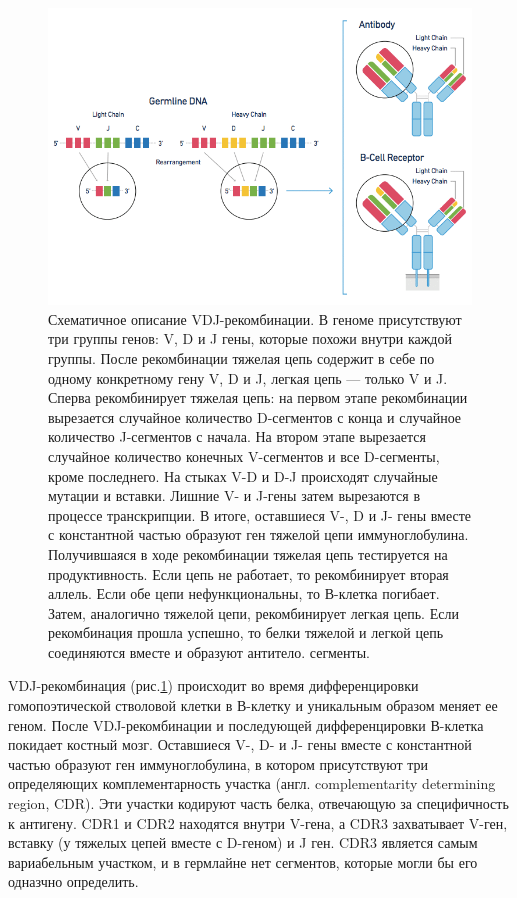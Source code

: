 \documentclass{spbau-diploma}
\begin{document}
\begin{figure}[h!]
    \centering
    \includegraphics[width=.9\textwidth]{figures/10x_vdj_recombination.png}
    \caption{Схематичное описание VDJ-рекомбинации.
    В геноме присутствуют три группы генов: V, D и J гены, которые похожи внутри каждой группы.
    После рекомбинации тяжелая цепь содержит в себе по одному конкретному гену V, D и J, легкая цепь --- только V и J.
    Сперва рекомбинирует тяжелая цепь: на первом этапе рекомбинации вырезается случайное количество D-сегментов с конца и случайное количество J-сегментов с начала.
    На втором этапе вырезается случайное количество конечных V-сегментов и все D-сегменты, кроме последнего.
    На стыках V-D и D-J происходят случайные мутации и вставки.
    Лишние V- и J-гены затем вырезаются в процессе транскрипции.
    В итоге, оставшиеся V-, D и J- гены вместе с константной частью образуют ген тяжелой цепи иммуноглобулина.
    Получившаяся в ходе рекомбинации тяжелая цепь тестируется на продуктивность.
    Если цепь не работает, то рекомбинирует вторая аллель.
    Если обе цепи нефункциональны, то В-клетка погибает.
    Затем, аналогично тяжелой цепи, рекомбинирует легкая цепь.
    Если рекомбинация прошла успешно, то белки тяжелой и легкой цепь соединяются вместе и образуют антитело.
    сегменты.}
    \label{10x_vdj_recombination}
\end{figure}

VDJ-рекомбинация (рис.\ref{10x_vdj_recombination}) происходит во время дифференцировки гомопоэтической стволовой клетки в В-клетку и уникальным образом меняет ее геном. 
После VDJ-рекомбинации и последующей дифференцировки В-клетка покидает костный мозг.
Оставшиеся V-, D- и J- гены вместе с константной частью образуют ген иммуноглобулина, в котором присутствуют три определяющих комплементарность участка (англ. complementarity determining region, CDR). 
Эти участки кодируют часть белка, отвечающую за специфичность к антигену. 
CDR1 и CDR2 находятся внутри V-гена, а CDR3 захватывает V-ген, вставку (у тяжелых цепей вместе с D-геном) и J ген. 
CDR3  является самым вариабельным участком, и в гермлайне нет сегментов, которые могли бы его одназчно определить.     
\end{document}
